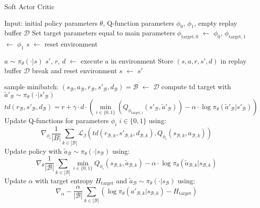 \begin{algorithm}[p]
\caption{Soft Actor Critic}\label{alg:SAC}
\begin{algorithmic}
    \State{} Input: initial policy parameters $\theta$, Q-function parameters $\phi_0$, $\phi_1$, empty replay buffer $\mathcal{D}$
        \State{} Set target parameters equal to main parameters $\phi_{\text{target}, 0}$ $\leftarrow$ $\phi_0$, $\phi_{\text{target}, 1}$ $\leftarrow$ $\phi_1$ 
        \State{} $s$ $\leftarrow$ reset environment
        
        \State{} $a$ $\sim$ $\pi_\theta(\cdot | s)$
        \State{} $s'$, $r$, $d$ $\leftarrow$ execute $a$ in environment
        \State{} Store $(s, a, r, s', d)$ in replay buffer $\mathcal{D}$
        \State{} break and reset environment
        \EndIf{}
        \State{} $s$ $\leftarrow$ $s'$
        \EndFor{}
        
        \State{} sample minibatch: $(s_\mathcal{B}, a_\mathcal{B}, r_\mathcal{B}, s'_\mathcal{B}, d_\mathcal{B}) = \mathcal{B}$ $\leftarrow$ $\mathcal{D}$ 
        \State{} compute td target with $\tilde{a}'_\mathcal{B} \sim \pi_\theta(\cdot|s'_\mathcal{B})$
        \begin{equation*}
            td(r_\mathcal{B}, s'_\mathcal{B}, d_\mathcal{B}) = r + \gamma \cdot d \cdot \left(\min_{i\in\{0, 1\}}\left(Q_{\phi_{\text{target}, i}}(s'_\mathcal{B}, \tilde{a}'_\mathcal{B})\right) - \alpha \cdot \log \pi_\theta(\tilde{a}'_\mathcal{B}|s'_\mathcal{B})\right)
        \end{equation*}
        \State{} Update Q-functions for parameters $\phi_i$ $i \in \{0, 1\}$ using:
        \begin{equation*}
            \nabla_{\phi_i} \frac{1}{|B|} \sum_{k \in |\mathcal{B}|}\mathcal{L}_\beta\left(td(r_{\mathcal{B}, k}, s'_{\mathcal{B}, k}, d_{\mathcal{B}, k}), Q_{\phi_i}(s_{\mathcal{B}, k}, a_{\mathcal{B}, k})\right)    
        \end{equation*}
        \State{} Update policy with $\tilde{a}_\mathcal{B} \sim \pi_\theta(\cdot|s_\mathcal{B})$ using:
        \begin{equation*}
           \nabla_{\theta} \frac{1}{|\mathcal{B}|}\sum_{k \in |\mathcal{B}|}\min_{i\in\{0, 1\}}Q_{\phi_i}(s_{\mathcal{B}, k}, \tilde{a}_{\mathcal{B}, k}) - \alpha \cdot \log \pi_\theta(\tilde{a}_{\mathcal{B}, k}|s_{\mathcal{B}, k})
        \end{equation*}
        \State{} Update $\alpha$ with target entropy $H_\text{target}$ and $\tilde{a}_\mathcal{B} \sim \pi_\theta(\cdot|s_\mathcal{B})$ using:
        \begin{equation*}
            \nabla_\alpha -\frac{\alpha}{|\mathcal{B}|} \sum_{k \in |\mathcal{B}|} \left(\log \pi_\theta(a'_{\mathcal{B}, k}|s_{\mathcal{B}, k}) - H_\text{target}\right)
        \end{equation*}
        \EndFor{}
        \EndIf{}
        \EndFor{}
\end{algorithmic}
\end{algorithm}
